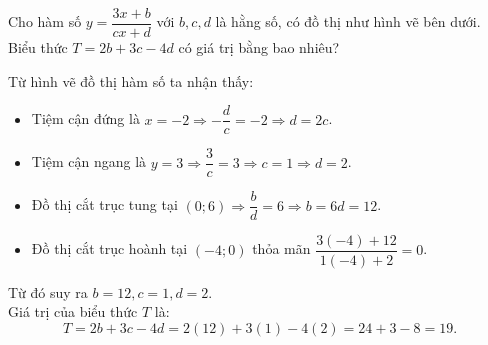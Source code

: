 \begin{ex}
Cho hàm số $y = \dfrac{3x+b}{cx+d}$ với $b, c, d$ là hằng số, có đồ thị như hình vẽ bên dưới. Biểu thức $T = 2b + 3c - 4d$ có giá trị bằng bao nhiêu?
\begin{center}
\end{center}
\begin{loigiai}
Từ hình vẽ đồ thị hàm số ta nhận thấy:
\begin{itemize}
    \item Tiệm cận đứng là $x = -2 \Rightarrow -\dfrac{d}{c} = -2 \Rightarrow d = 2c$.
    \item Tiệm cận ngang là $y = 3 \Rightarrow \dfrac{3}{c} = 3 \Rightarrow c = 1 \Rightarrow d = 2$.
    \item Đồ thị cắt trục tung tại $(0; 6) \Rightarrow \dfrac{b}{d} = 6 \Rightarrow b = 6d = 12$.
    \item Đồ thị cắt trục hoành tại $(-4; 0)$ thỏa mãn $\dfrac{3(-4)+12}{1(-4)+2} = 0$.
\end{itemize}
Từ đó suy ra $b = 12, c = 1, d = 2$.\\
Giá trị của biểu thức $T$ là:
\[ T = 2b + 3c - 4d = 2(12) + 3(1) - 4(2) = 24 + 3 - 8 = 19. \]
\end{loigiai}
\end{ex}
